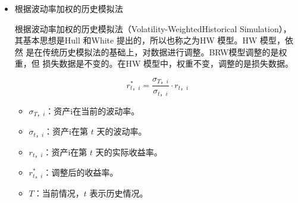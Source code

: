 \begin{itemize}
\begin{knowledgebox}{BRW法的优点：}
    \begin{itemize}

    \item （1）BRW方法很好地推广了传统历史模拟法。因为可以将传统历史模拟法，
看作是权重零递减的特殊情况，相当于入=1的情况。当入=1时，所有数据的权重
都是一样的。即历史模拟法是BRW方法的特殊情况，BRW方法只是在历史模
拟法的基础上进行了改进。
\item（2）在传统历史模拟法下，权重是1/n。在BRW方法中，每个数据的权重，
要根据具体的时间而定。如果是比较古老的数据，权重会低很多。如果是比较近
期的数据，权重会很高。
\item（3）BRW方法能够降低鬼影效应。随着观测数据值年龄的增加，相应的权
重会慢慢衰减。当它最终退出样本周期时，其权重也会从入\(
\lambda^{n-1} \omega(1)
\)变成0，而不
是从1/n变成0。所以它能够降低鬼影效应，但并不是完全消除。
\item（4）保证了数据的有效性和利用率。BRW方法可以使极端值的影响随着时
间的流逝而降低，所以可以让样本容量随着时间的流逝而变大。在BRW中，我
们不会剔除任何一个数据，每个数据都会一直存在，只不过当它变成了第101天时，
权重就是101天的权重。变成第1000天时，对应的权重就是1000天的权重，这
个权重非常小，近似等于0了。但最终是没有抛弃这个数据的，只是权重变低而已。
所以，数据是一直在利用。没有将原来的数据遗漏，既然没有遗漏的话，也就不
会出现所谓的跳跃（iump）。
\end{itemize}

\end{knowledgebox}

    \item 根据波动率加权的历史模拟法
    
    根据波动率加权的历史模拟法（Volatility-WeightedHistorical Simulation），
    其基本思想是Hull 和White 提出的，所以也称之为HW 模型。HW 模型，依然
    是在传统历史模拟法的基础上，对数据进行调整。BRW模型调整的是权重，但
    损失数据是不变的。在HW 模型中，权重不变，调整的是损失数据。
    
\[
r_{t，i}^* = \frac{\sigma_{T，i}}{\sigma_{t，i}} \cdot r_{t，i}
\]




\begin{itemize}
    \item \(\sigma_{T，i}\)：资产i在当前的波动率。
    \item \(\sigma_{t，i}\)：资产i在第 \(t\) 天的波动率。
    \item \(r_{t，i}\)：资产i在第 \(t\) 天的实际收益率。
    \item \(r_{t，i}^*\)：调整后的收益率。
    \item \(T\)：当前情况，\(t\) 表示历史情况。
\end{itemize}


\end{itemize}
